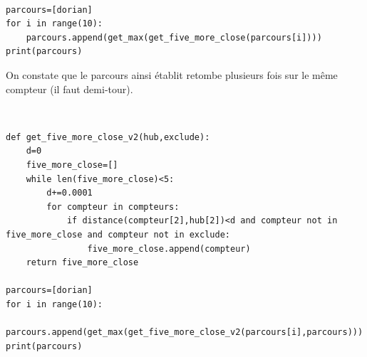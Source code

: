 
\begin{solution}~\ \\
\begin{verbatim}
parcours=[dorian]
for i in range(10):
    parcours.append(get_max(get_five_more_close(parcours[i])))
print(parcours)
\end{verbatim}
\end{solution}

On constate que le parcours ainsi établit retombe plusieurs fois sur le même compteur (il faut \og demi-tour\fg).



\begin{solution}~\ \\
\begin{verbatim}
def get_five_more_close_v2(hub,exclude):
    d=0
    five_more_close=[]
    while len(five_more_close)<5:
        d+=0.0001
        for compteur in compteurs:
            if distance(compteur[2],hub[2])<d and compteur not in five_more_close and compteur not in exclude:
                five_more_close.append(compteur)
    return five_more_close

parcours=[dorian]
for i in range(10):
    parcours.append(get_max(get_five_more_close_v2(parcours[i],parcours)))
print(parcours)
\end{verbatim}
\end{solution}




